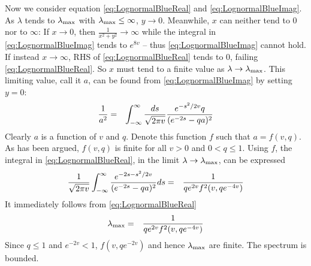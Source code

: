 \documentclass{article}
\begin{document}
Now we consider equation \eqref{eq:LognormalBlueReal} and
\eqref{eq:LognormalBlueImag}. As $\lambda$ tends to $\lambda_{\text{max}}$ with
$\lambda_{\text{max}} \leq \infty$, $y \to 0$. Meanwhile, $x$ can neither tend
to 0 nor to $\infty$: If $x \to 0$, then $\frac{1}{x^2 + y^2} \to
\infty$ while the integral in \eqref{eq:LognormalBlueImag} tends to
$e^{8v}$ -- thus \eqref{eq:LognormalBlueImag} cannot hold. If instead
$x \to \infty$, RHS of \eqref{eq:LognormalBlueReal} tends to 0, failing
\eqref{eq:LognormalBlueReal}. So $x$ must tend to a finite value as $\lambda
\to \lambda_{\text{max}}$. This limiting value, call it $a$, can be found from
\eqref{eq:LognormalBlueImag} by setting $y=0$:
\begin{eqnarray}
{1 \over a^2} &=& \int_{-\infty}^{\infty} \frac{ds}{\sqrt{2\pi v}}
\frac{
  e^{-s^2/2v} q
}{
  (e^{-2s} - qa)^2
} \label{eq:LognormalBlueImag2}
\end{eqnarray}
Clearly $a$ is a function of $v$ and $q$. Denote this function $f$
such that $a = f(v, q)$. As has been argued, $f(v,q)$ is finite for
all $v > 0$ and $0 < q \leq 1$. Using $f$, the integral in
\eqref{eq:LognormalBlueReal}, in the limit $\lambda \to \lambda_{\text{max}}$,
can be expressed
\begin{eqnarray*}
  {1 \over \sqrt{2\pi v}} \int_{-\infty}^{\infty} \frac{
    e^{-2s - s^2/2v}
    }{
      (e^{-2s} - qa)^2
    } ds &=& {1 \over q e^{2v} f^2(v, qe^{-4v})}
\end{eqnarray*}
It immediately follows from \eqref{eq:LognormalBlueReal}
\begin{eqnarray*}
  \lambda_{\text{max}} &=& {1 \over q e^{2v} f^2(v, qe^{-4v})}
\end{eqnarray*}
Since $q \leq 1$ and $e^{-2v} < 1$, $f(v, qe^{-2v})$ and hence
$\lambda_{\text{max}}$ are finite. The spectrum is bounded.
\end{document}
